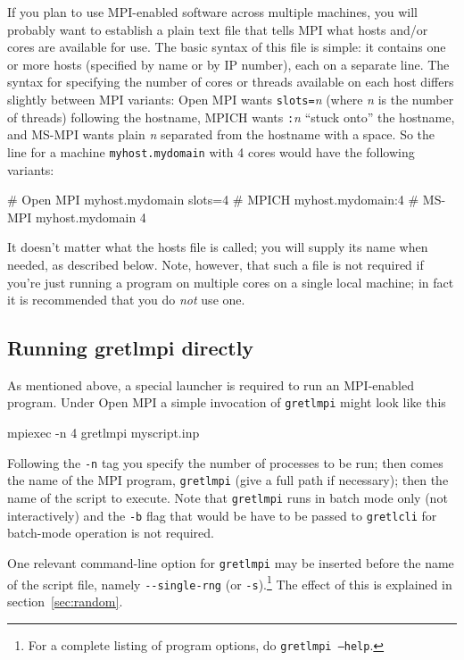 \documentclass{article}
\begin{document}
If you plan to use MPI-enabled software across multiple machines, you
will probably want to establish a plain text file that tells MPI what
hosts and/or cores are available for use. The basic syntax of this
file is simple: it contains one or more hosts (specified by name or by
IP number), each on a separate line.  The syntax for specifying the
number of cores or threads available on each host differs slightly
between MPI variants: \textsf{Open MPI} wants
\texttt{slots=}\textsl{n} (where \textsl{n} is the number of threads)
following the hostname, \textsf{MPICH} wants \texttt{:}\textsl{n}
``stuck onto'' the hostname, and \textsf{MS-MPI} wants plain
\textsl{n} separated from the hostname with a space. So the line for a
machine \texttt{myhost.mydomain} with 4 cores would have the following
variants:
\begin{code}
# Open MPI
myhost.mydomain slots=4
# MPICH
myhost.mydomain:4
# MS-MPI
myhost.mydomain 4
\end{code}

It doesn't matter what the hosts file is called; you will supply its
name when needed, as described below. Note, however, that such a file
is not required if you're just running a program on multiple cores on
a single local machine; in fact it is recommended that you do
\textit{not} use one.

\subsection{Running gretlmpi directly}
\label{subsec:gretlmpi}

As mentioned above, a special launcher is required to run an
MPI-enabled program. Under \textsf{Open MPI} a simple invocation of
\texttt{gretlmpi} might look like this
\begin{code}
mpiexec -n 4 gretlmpi myscript.inp
\end{code}
Following the \verb|-n| tag you specify the number of processes to be
run; then comes the name of the MPI program, \texttt{gretlmpi}
(give a full path if necessary); then the name of the script to
execute. Note that \texttt{gretlmpi} runs in batch mode only (not
interactively) and the \verb|-b| flag that would be have to be passed
to \texttt{gretlcli} for batch-mode operation is not required.

One relevant command-line option for \texttt{gretlmpi} may be
inserted before the name of the script file, namely
\verb|--single-rng| (or \verb|-s|).\footnote{For a complete listing of
  program options, do \texttt{gretlmpi --help}.}  The effect of
this is explained in section~\ref{sec:random}.
\end{document}
